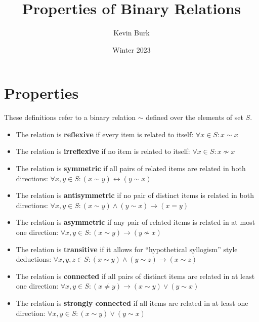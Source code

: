 \documentclass{article}
\title{Properties of Binary Relations}
\author{Kevin Burk}
\date{Winter 2023}
\begin{document}
\maketitle

\section{Properties}

These definitions refer to a binary relation $\sim$ defined over the elements of set $S$.

\begin{itemize}
    \item The relation is \textbf{reflexive} if every item is related to itself:
    $\forall x \in S : x \sim x$

    \item The relation is \textbf{irreflexive} if no item is related to itself:
    $\forall x \in S : x \not\sim x$

    \item The relation is \textbf{symmetric} if all pairs of related items are related in both directions:
    $\forall x, y \in S : (x \sim y) \leftrightarrow (y \sim x)$

    \item The relation is \textbf{antisymmetric} if no pair of distinct items is related in both directions:
    $\forall x, y \in S : (x \sim y) \wedge (y \sim x) \rightarrow (x = y)$

    \item The relation is \textbf{asymmetric} if any pair of related items is related in at most one direction:
    $\forall x, y \in S : (x \sim y) \rightarrow (y \not\sim x)$

    \item The relation is \textbf{transitive} if it allows for ``hypothetical syllogism'' style deductions:
    $\forall x, y, z \in S : (x \sim y) \wedge (y \sim z) \rightarrow (x \sim z)$

    \item The relation is \textbf{connected} if all pairs of distinct items are related in at least one direction:
    $\forall x, y \in S : (x \neq y) \rightarrow (x \sim y) \vee (y \sim x)$

    \item The relation is \textbf{strongly connected} if all items are related in at least one direction:
    $\forall x, y \in S : (x \sim y) \vee (y \sim x)$
\end{itemize}
\end{document}
